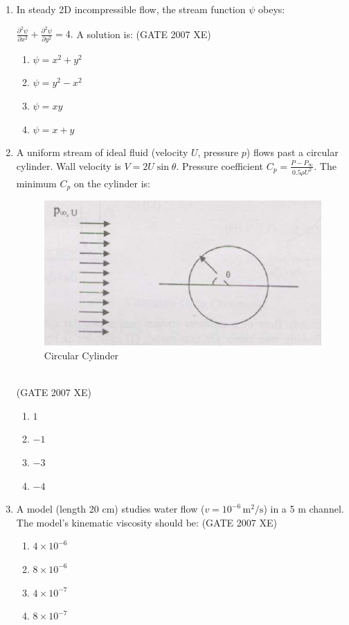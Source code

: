 \documentclass[journal,cmex10]{IEEEtran}
\theoremstyle{remark}
\numberwithin{equation}{enumi}
\numberwithin{figure}{enumi}
\begin{document}
\begin{enumerate}

\item In steady 2D incompressible flow, the stream function $\psi$ obeys:  

$\frac{\partial^2 \psi}{\partial x^2} + \frac{\partial^2 \psi}{\partial y^2} = 4.$ 
A solution is:
\hfill{(GATE 2007 XE)}
\begin{multicols}{4}
\begin{enumerate}
    \item $\psi = x^2 + y^2$
    \item $\psi = y^2 - x^2$
    \item $\psi = xy$
    \item $\psi = x + y$
\end{enumerate}
\end{multicols}


\item A uniform stream of ideal fluid (velocity $U$, pressure $p$) flows past a circular cylinder. Wall velocity is $V = 2U \sin \theta$. Pressure coefficient $C_p = \frac{P - P_\infty}{0.5 \rho U^2}$. The minimum $C_p$ on the cylinder is:  
\begin{figure}[htbp]
  \centering
  \includegraphics[width=0.6\columnwidth]{figs/D/fig2.png}
  \caption{Circular Cylinder}
  \label{fig:D/fig2.png}
\end{figure}\\
\hfill{(GATE 2007 XE)}
\begin{multicols}{4}
\begin{enumerate}
    \item $1$
    \item $-1$
    \item $-3$
    \item $-4$
\end{enumerate}
\end{multicols}
\newpage
\item A model (length 20 cm) studies water flow ($v=10^{-6}\,\text{m}^2/\text{s}$) in a 5 m channel. The model’s kinematic viscosity should be:  
\hfill{(GATE 2007 XE)}
\begin{multicols}{4}
\begin{enumerate}
    \item $4 \times 10^{-6}$
    \item $8 \times 10^{-6}$
    \item $4 \times 10^{-7}$
    \item $8 \times 10^{-7}$
\end{enumerate}
\end{multicols}


\end{enumerate}
\end{document}
